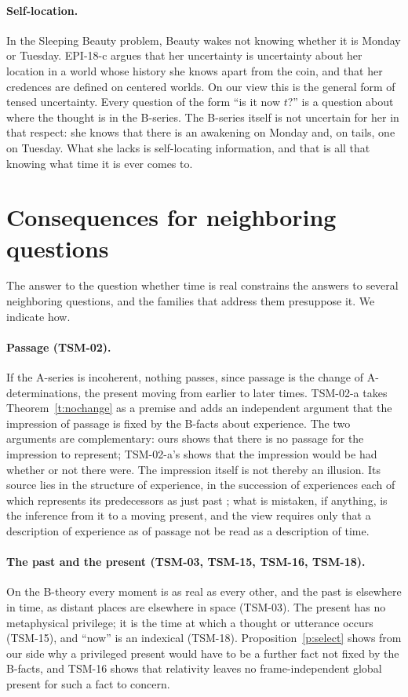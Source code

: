 \documentclass{situationist-preprint}
\begin{document}
\paragraph{Self-location.} In the Sleeping Beauty problem, Beauty wakes not knowing whether it is Monday or Tuesday. EPI-18-c argues that her uncertainty is uncertainty about her location in a world whose history she knows apart from the coin, and that her credences are defined on centered worlds. On our view this is the general form of tensed uncertainty. Every question of the form \enquote{is it now $t$?} is a question about where the thought is in the B-series. The B-series itself is not uncertain for her in that respect: she knows that there is an awakening on Monday and, on tails, one on Tuesday. What she lacks is self-locating information, and that is all that knowing what time it is ever comes to.

\section{Consequences for neighboring questions}\label{s:neighbors}

The answer to the question whether time is real constrains the answers to several neighboring questions, and the families that address them presuppose it. We indicate how.

\paragraph{Passage (TSM-02).} If the A-series is incoherent, nothing passes, since passage is the change of A-determinations, the present moving from earlier to later times. TSM-02-a takes Theorem~\ref{t:nochange} as a premise and adds an independent argument that the impression of passage is fixed by the B-facts about experience. The two arguments are complementary: ours shows that there is no passage for the impression to represent; TSM-02-a's shows that the impression would be had whether or not there were. The impression itself is not thereby an illusion. Its source lies in the structure of experience, in the succession of experiences each of which represents its predecessors as just past \citep{Williams1951}; what is mistaken, if anything, is the inference from it to a moving present, and the view requires only that a description of experience as of passage not be read as a description of time.

\paragraph{The past and the present (TSM-03, TSM-15, TSM-16, TSM-18).} On the B-theory every moment is as real as every other, and the past is elsewhere in time, as distant places are elsewhere in space (TSM-03). The present has no metaphysical privilege; it is the time at which a thought or utterance occurs (TSM-15), and \enquote{now} is an indexical (TSM-18). Proposition~\ref{p:select} shows from our side why a privileged present would have to be a further fact not fixed by the B-facts, and TSM-16 shows that relativity leaves no frame-independent global present for such a fact to concern.
\end{document}
